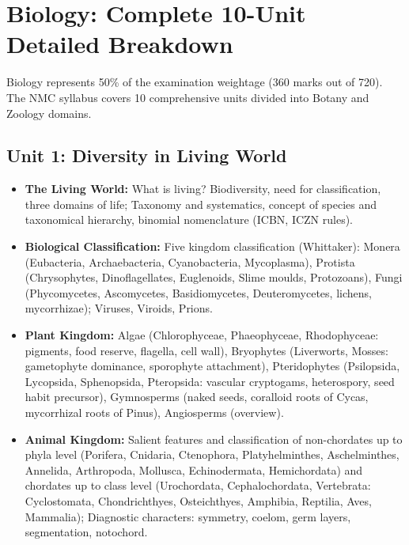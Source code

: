 \documentclass[11pt,a4paper]{article}
\begin{document}
\section{Biology: Complete 10-Unit Detailed Breakdown}

Biology represents 50\% of the examination weightage (360 marks out of 720). The NMC syllabus covers 10 comprehensive units divided into Botany and Zoology domains.

\subsection{Unit 1: Diversity in Living World}
\begin{itemize}
  \item \textbf{The Living World:} What is living? Biodiversity, need for classification, three domains of life; Taxonomy and systematics, concept of species and taxonomical hierarchy, binomial nomenclature (ICBN, ICZN rules).
  \item \textbf{Biological Classification:} Five kingdom classification (Whittaker): Monera (Eubacteria, Archaebacteria, Cyanobacteria, Mycoplasma), Protista (Chrysophytes, Dinoflagellates, Euglenoids, Slime moulds, Protozoans), Fungi (Phycomycetes, Ascomycetes, Basidiomycetes, Deuteromycetes, lichens, mycorrhizae); Viruses, Viroids, Prions.
  \item \textbf{Plant Kingdom:} Algae (Chlorophyceae, Phaeophyceae, Rhodophyceae: pigments, food reserve, flagella, cell wall), Bryophytes (Liverworts, Mosses: gametophyte dominance, sporophyte attachment), Pteridophytes (Psilopsida, Lycopsida, Sphenopsida, Pteropsida: vascular cryptogams, heterospory, seed habit precursor), Gymnosperms (naked seeds, coralloid roots of Cycas, mycorrhizal roots of Pinus), Angiosperms (overview).
  \item \textbf{Animal Kingdom:} Salient features and classification of non-chordates up to phyla level (Porifera, Cnidaria, Ctenophora, Platyhelminthes, Aschelminthes, Annelida, Arthropoda, Mollusca, Echinodermata, Hemichordata) and chordates up to class level (Urochordata, Cephalochordata, Vertebrata: Cyclostomata, Chondrichthyes, Osteichthyes, Amphibia, Reptilia, Aves, Mammalia); Diagnostic characters: symmetry, coelom, germ layers, segmentation, notochord.
\end{itemize}
\end{document}
